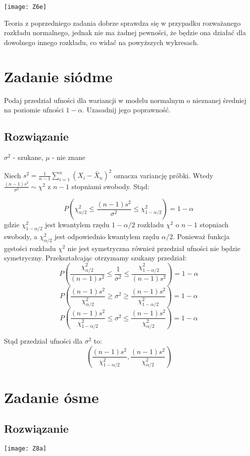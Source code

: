 \documentclass[a4paper]{article}
\begin{document}
\texttt{[image: Z6e]}

Teoria z poprzedniego zadania dobrze sprawdza się w przypadku rozważanego rozkładu normalnego, jednak nie ma żadnej pewności, że będzie ona działać dla dowolnego innego rozkładu, co widać na powyższych wykresach.


\section{Zadanie siódme}
Podaj przedział ufności dla wariancji w modelu normalnym o nieznanej średniej na poziomie ufności $1-\alpha$. Uzasadnij jego poprawność.

\subsection{Rozwiązanie}
$\sigma^2$ - szukane, $\mu$ - nie znane

Niech $s^2=\frac{1}{n-1}\sum_{i=1}^n(X_i-\bar{X}_n)^2$ oznacza variancję próbki. Wtedy $\frac{(n-1)s^2}{\sigma^2}\sim\chi^2$ z $n-1$ stopniami swobody. Stąd:

$$P(\chi^2_{\alpha/2}\leq\frac{(n-1)s^2}{\sigma^2}\leq\chi^2_{1-\alpha/2})=1-\alpha$$
gdzie $\chi^2_{1-\alpha/2}$ jest kwantylem rzędu ${1-\alpha/2}$ rozkładu $\chi^2$ o $n-1$ stopniach swobody, a $\chi^2_{\alpha/2}$ jest odpowiednio kwantylem rzędu $\alpha/2$. Ponieważ funkcja gęstości rozkładu $\chi^2$ nie jest symetryczna również przedział ufności nie będzie symetryczny. Przekształcając otrzymamy szukany przedział:
$$P(\frac{\chi^2_{\alpha/2}}{(n-1)s^2}\leq\frac{1}{\sigma^2}\leq\frac{\chi^2_{1-\alpha/2}}{(n-1)s^2})=1-\alpha$$
$$P(\frac{(n-1)s^2}{\chi^2_{\alpha/2}}\geq\sigma^2\geq\frac{(n-1)s^2}{\chi^2_{1-\alpha/2}})=1-\alpha$$
$$P(\frac{(n-1)s^2}{\chi^2_{1-\alpha/2}}\leq\sigma^2\leq\frac{(n-1)s^2}{\chi^2_{\alpha/2}})=1-\alpha$$

Stąd przedział ufności dla $\sigma^2$ to:
$$(\frac{(n-1)s^2}{\chi^2_{1-\alpha/2}},\frac{(n-1)s^2}{\chi^2_{\alpha/2}})$$

\section{Zadanie ósme}

\subsection{Rozwiązanie}

\texttt{[image: Z8a]}
\end{document}
